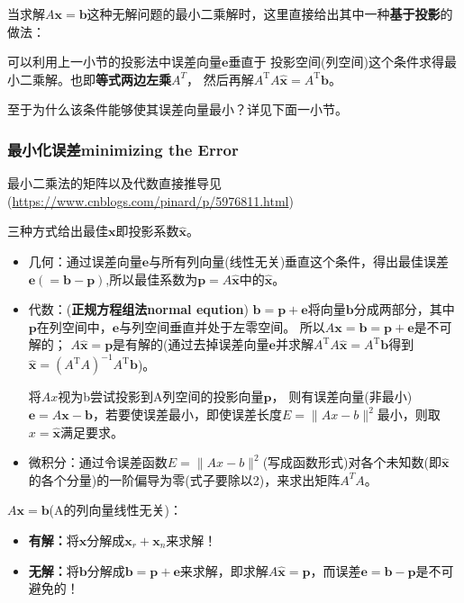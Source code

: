     当求解$A \boldsymbol{x}=\bm{b}$这种无解问题的最小二乘解时，这里直接给出其中一种\textbf{基于投影}的做法：

    可以利用上一小节的投影法中误差向量$\bm{e}$垂直于
    投影空间(列空间)这个条件求得最小二乘解。也即\textbf{等式两边左乘$A^T$}，
    然后再解$A^{\mathrm{T}} A \widehat{\boldsymbol{x}}=A^{\mathrm{T}} \boldsymbol{b}$。

    至于为什么该条件能够使其误差向量最小？详见下面一小节。

    \subsubsection{最小化误差minimizing the Error}
    最小二乘法的矩阵以及代数直接推导见(\url{https://www.cnblogs.com/pinard/p/5976811.html})

    三种方式给出最佳$\bm{x}$即投影系数$\hat{\bm{x}}$。
    \begin{itemize}
        \item 几何：通过误差向量$\bm{e}$与所有列向量(线性无关)垂直这个条件，得出最佳误差$\bm{e}(=\bm{b}-\bm{p})$,所以最佳系数为$\boldsymbol{p} = A \widehat{\boldsymbol{x}}$中的$\bm{\hat{x}}$。
        \item 代数：(\textbf{正规方程组法normal eqution})
        $\bm{b} = \bm{p} + \bm{e}$将向量$\bm{b}$分成两部分，其中$\bm{p}$在列空间中，$\bm{e}$与列空间垂直并处于左零空间。
        所以$A \boldsymbol{x}=\boldsymbol{b}=\boldsymbol{p}+\boldsymbol{e}$是不可解的；
        $A \widehat{\boldsymbol{x}}=\boldsymbol{p}$是有解的(通过去掉误差向量$\bm{e}$并求解$A^{\mathrm{T}} A \widehat{\boldsymbol{x}}=A^{\mathrm{T}} \boldsymbol{b}$得到$\widehat{\boldsymbol{x}} = \left(A^{\mathrm{T}} A\right)^{-1} A^{\mathrm{T}} \boldsymbol{b}$)。

        将$A x$视为b尝试投影到A列空间的投影向量$\bm{p}$，
        则有误差向量(非最小)$\bm{e} = A\bm{x} - \bm{b}$，若要使误差最小，即使误差长度$E=\|A x-b\|^{2}$最小，则取$x= \widehat{\bm{x}}$满足要求。
        \item 微积分：通过令误差函数$E=\|A x-b\|^{2}$(写成函数形式)对各个未知数(即$\widehat{\bm{x}}$的各个分量)的一阶偏导为零(式子要除以2)，来求出矩阵$A^T A$。
    \end{itemize}
    $A\bm{x}=\bm{b}$(A的列向量线性无关)：
    \begin{itemize}
        \item \textbf{有解：}将$\bm{x}$分解成$\boldsymbol{x}_{r}+\boldsymbol{x}_{n}$来求解！
        \item \textbf{无解：}将$\bm{b}$分解成$\bm{b=p+e}$来求解，即求解$A \widehat{\boldsymbol{x}}=\boldsymbol{p}$，而误差$\bm{e}=\boldsymbol{b}-\boldsymbol{p}$是不可避免的！
    \end{itemize}
